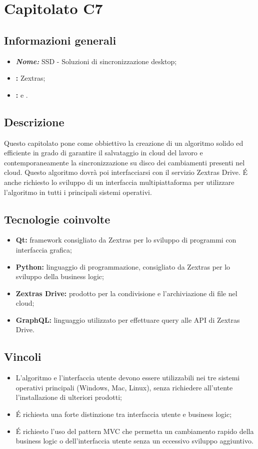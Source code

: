 \section{Capitolato C7}

\subsection{Informazioni generali}
\begin{itemize}
\item \textbf{\emph{Nome:}} SSD - Soluzioni di sincronizzazione desktop;
\item \textbf{\commitProg:} Zextras;
\item \textbf{\proponProg:} \VT{} e \CR.
\end{itemize}

\subsection{Descrizione}
Questo capitolato pone come obbiettivo la creazione di un algoritmo solido ed efficiente in grado di garantire il salvataggio in cloud del lavoro e contemporaneamente la sincronizzazione su disco dei cambiamenti presenti nel cloud. Questo algoritmo dovrà poi interfacciarsi con il servizio Zextras Drive. É anche richiesto lo sviluppo di un interfaccia multipiattaforma per utilizzare l'algoritmo in tutti i principali sistemi operativi.

\subsection{Tecnologie coinvolte}
\begin{itemize}
\item \textbf{Qt:} framework consigliato da Zextras per lo sviluppo di programmi con interfaccia grafica;
\item \textbf{Python:} linguaggio di programmazione, consigliato da Zextras per lo sviluppo della business logic;
\item \textbf{Zextras Drive:} prodotto per la condivisione e l'archiviazione di file nel cloud;
\item \textbf{GraphQL:} linguaggio utilizzato per effettuare query alle API di Zextras Drive.
\end{itemize}

\subsection{Vincoli}
\begin{itemize}
\item L'algoritmo e l'interfaccia utente devono essere utilizzabili nei tre sistemi operativi principali (Windows, Mac, Linux), senza richiedere all'utente l'installazione di ulteriori prodotti;
\item É richiesta una forte distinzione tra interfaccia utente e business logic;
\item É richiesto l'uso del pattern MVC che permetta un cambiamento rapido della business logic o dell'interfaccia utente senza un eccessivo sviluppo aggiuntivo.
\end{itemize}


